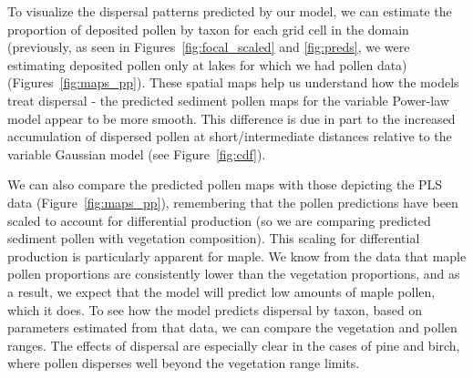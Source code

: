 \documentclass[12pt]{article}
\begin{document}



To visualize the dispersal patterns predicted by our model, we can
estimate the proportion of deposited pollen by taxon for each grid
cell in the domain (previously, as seen in
Figures~\ref{fig:focal_scaled} and \ref{fig:preds}, we were estimating
deposited pollen only at lakes for which we had pollen data)
(Figures~\ref{fig:maps_pp}). These spatial maps help us understand how
the models treat dispersal - the predicted sediment pollen maps for
the variable Power-law model appear to be more smooth. This difference
is due in part to the increased accumulation of dispersed pollen at
short/intermediate distances relative to the variable Gaussian model
(see Figure~\ref{fig:cdf}).

We can also compare the predicted pollen maps with those depicting the
PLS data (Figure~\ref{fig:maps_pp}), remembering that the pollen
predictions have been scaled to account for differential production
(so we are comparing predicted sediment pollen with vegetation
composition). This scaling for differential production is particularly
apparent for maple. We know from the data that maple pollen
proportions are consistently lower than the vegetation proportions,
and as a result, we expect that the model will predict low amounts of
maple pollen, which it does. To see how the model predicts dispersal
by taxon, based on parameters estimated from that data, we can compare
the vegetation and pollen ranges. The effects of dispersal are
especially clear in the cases of pine and birch, where pollen
disperses well beyond the vegetation range limits.
\end{document}
